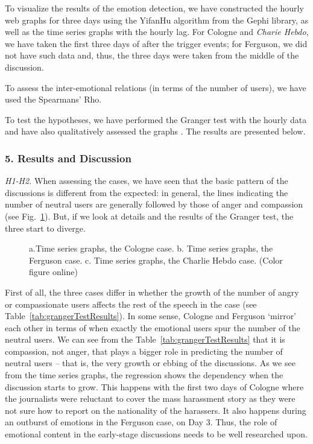 To visualize the results of the emotion detection, we have constructed the hourly web graphs for three days using the YifanHu algorithm from the Gephi library, as well as the time series graphs with the hourly lag. For Cologne and \textit{Charie Hebdo}, we have taken the first three days of after the trigger events; for Ferguson, we did not have such data and, thus, the three days were taken from the middle of the discussion.

To assess the inter-emotional relations (in terms of the number of users), we have used the Spearmans’ Rho.

To test the hypotheses, we have performed the Granger test with the hourly data and have also qualitatively assessed the graphs \cite{Wessa}. The results are presented below.

\subsubsection{5. Results and Discussion}

\textit{H1-H2.} When assessing the cases, we have seen that the basic pattern of the discussions is different from the expected: in general, the lines indicating the number of neutral users are generally followed by those of anger and compassion (see Fig.~\cref{fig:timeSeriesGraphs}). But, if we look at details and the results of the Granger test, the three start to diverge.

\begin{figure}[ht]
	\caption{a.Time series graphs, the Cologne case. b. Time series graphs, the Ferguson case. c. Time series graphs, the Charlie Hebdo case. (Color figure online)}\label{fig:timeSeriesGraphs}
\end{figure}

First of all, the three cases differ in whether the growth of the number of angry or compassionate users affects the rest of the speech in the case (see Table~\cref{tab:grangerTestResults}). In some sense, Cologne and Ferguson ‘mirror’ each other in terms of when exactly the emotional users spur the number of the neutral users. We can see from the Table~\cref{tab:grangerTestResults} that it is compassion, not anger, that plays a bigger role in predicting the number of neutral users -- that is, the very growth or ebbing of the discussions. As we see from the time series graphs, the regression shows the dependency when the discussion starts to grow. This happens with the first two days of Cologne where the journalists were reluctant to cover the mass harassment story as they were not sure how to report on the nationality of the harassers. It also happens during an outburst of emotions in the Ferguson case, on Day 3. Thus, the role of emotional content in the early-stage discussions needs to be well researched upon.


